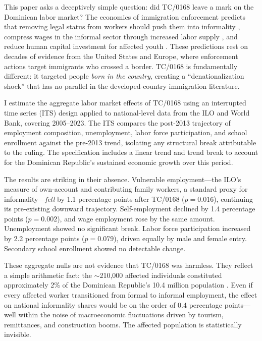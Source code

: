 \documentclass[12pt]{article}
\begin{document}
This paper asks a deceptively simple question: did TC/0168 leave a mark on the Dominican labor market? The economics of immigration enforcement predicts that removing legal status from workers should push them into informality \citep{kossoudji2002effect, orrenius2015behind}, compress wages in the informal sector through increased labor supply \citep{borjas2003labor, dustmann2013effect}, and reduce human capital investment for affected youth \citep{lafortune2019deferred}. These predictions rest on decades of evidence from the United States and Europe, where enforcement actions target immigrants who crossed a border. TC/0168 is fundamentally different: it targeted people \textit{born in the country}, creating a ``denationalization shock'' that has no parallel in the developed-country immigration literature.

I estimate the aggregate labor market effects of TC/0168 using an interrupted time series (ITS) design applied to national-level data from the ILO and World Bank, covering 2005--2023. The ITS compares the post-2013 trajectory of employment composition, unemployment, labor force participation, and school enrollment against the pre-2013 trend, isolating any structural break attributable to the ruling. The specification includes a linear trend and trend break to account for the Dominican Republic's sustained economic growth over this period.

The results are striking in their absence. Vulnerable employment---the ILO's measure of own-account and contributing family workers, a standard proxy for informality---\textit{fell} by 1.1 percentage points after TC/0168 ($p = 0.016$), continuing its pre-existing downward trajectory. Self-employment declined by 1.4 percentage points ($p = 0.002$), and wage employment rose by the same amount. Unemployment showed no significant break. Labor force participation increased by 2.2 percentage points ($p = 0.079$), driven equally by male and female entry. Secondary school enrollment showed no detectable change.

These aggregate nulls are not evidence that TC/0168 was harmless. They reflect a simple arithmetic fact: the $\sim$210,000 affected individuals constituted approximately 2\% of the Dominican Republic's 10.4 million population \citep{one2013eni}. Even if every affected worker transitioned from formal to informal employment, the effect on national informality shares would be on the order of 0.4 percentage points---well within the noise of macroeconomic fluctuations driven by tourism, remittances, and construction booms. The affected population is statistically invisible.
\end{document}
